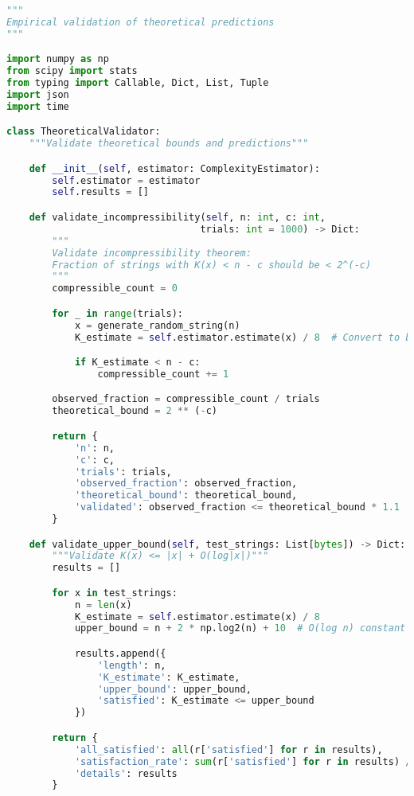 \documentclass[12pt,a4paper]{report}
\begin{document}
\begin{lstlisting}[language=Python, caption=Validation Testing Protocol]
"""
Empirical validation of theoretical predictions
"""

import numpy as np
from scipy import stats
from typing import Callable, Dict, List, Tuple
import json
import time

class TheoreticalValidator:
    """Validate theoretical bounds and predictions"""

    def __init__(self, estimator: ComplexityEstimator):
        self.estimator = estimator
        self.results = []

    def validate_incompressibility(self, n: int, c: int,
                                  trials: int = 1000) -> Dict:
        """
        Validate incompressibility theorem:
        Fraction of strings with K(x) < n - c should be < 2^(-c)
        """
        compressible_count = 0

        for _ in range(trials):
            x = generate_random_string(n)
            K_estimate = self.estimator.estimate(x) / 8  # Convert to bytes

            if K_estimate < n - c:
                compressible_count += 1

        observed_fraction = compressible_count / trials
        theoretical_bound = 2 ** (-c)

        return {
            'n': n,
            'c': c,
            'trials': trials,
            'observed_fraction': observed_fraction,
            'theoretical_bound': theoretical_bound,
            'validated': observed_fraction <= theoretical_bound * 1.1  # 10% margin
        }

    def validate_upper_bound(self, test_strings: List[bytes]) -> Dict:
        """Validate K(x) <= |x| + O(log|x|)"""
        results = []

        for x in test_strings:
            n = len(x)
            K_estimate = self.estimator.estimate(x) / 8
            upper_bound = n + 2 * np.log2(n) + 10  # O(log n) constant

            results.append({
                'length': n,
                'K_estimate': K_estimate,
                'upper_bound': upper_bound,
                'satisfied': K_estimate <= upper_bound
            })

        return {
            'all_satisfied': all(r['satisfied'] for r in results),
            'satisfaction_rate': sum(r['satisfied'] for r in results) / len(results),
            'details': results
        }


\end{lstlisting}
\end{document}
